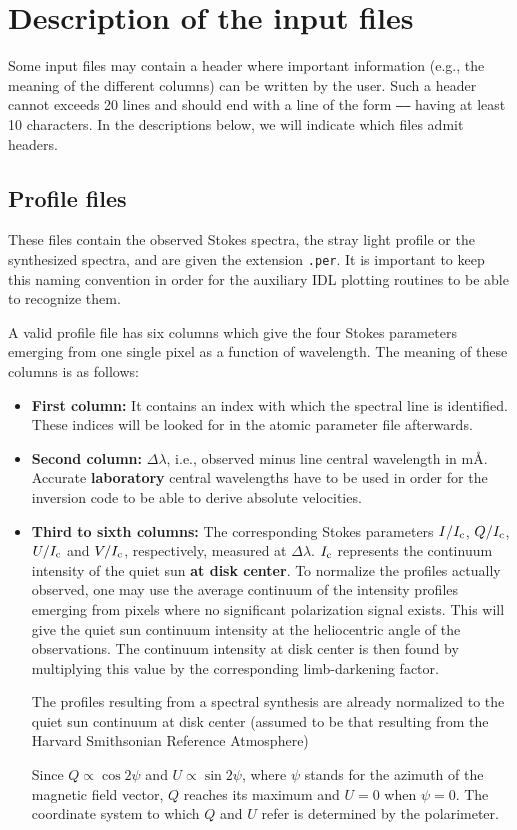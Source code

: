 \section{Description of the input files}
Some input files may contain a header where important information
(e.g., the meaning of the different columns) can be written by the
user. Such a header cannot exceeds 20 lines and should end with a line
of the form {\tt -----} having at least 10 characters. In the
descriptions below, we will indicate which files admit headers.

\subsection{Profile files}
\label{profiles}
These files contain the observed Stokes spectra, the stray light profile or
the synthesized spectra, and are given the extension {\tt .per}. It
is important to keep this naming convention in order for the auxiliary IDL 
plotting routines to be able to recognize them. 

A valid profile file has six columns which give the four Stokes parameters 
emerging from one single pixel as a function of wavelength. The meaning of 
these columns is as follows:
\begin{itemize}
\item {\bf First column:} It contains an index with which the spectral line is 
identified. These indices will be looked for in the atomic parameter file afterwards. 

\item {\bf Second column:} $\Delta \lambda$, i.e., observed minus line central 
wavelength in m\AA\/. Accurate {\bf laboratory} central wavelengths have to be used
in order for the inversion code to be able to derive absolute velocities.

\item {\bf Third to sixth columns:} The corresponding Stokes parameters
$I/I_{\rm c}$, $Q/I_{\rm c}$, $U/I_{\rm c}$ and $V/I_{\rm c}$,
respectively, measured at $\Delta \lambda$.  $I_{\rm c}$ represents the
continuum intensity of the quiet sun  {\bf at disk center}. To
normalize the profiles actually observed, one may use the average
continuum of the intensity profiles emerging from pixels where no
significant polarization signal exists. This will give the quiet
sun continuum intensity at the heliocentric angle of the observations. 
The continuum intensity at disk center is then found by multiplying this
value by the corresponding limb-darkening factor. 

The profiles resulting from a spectral synthesis are already normalized 
to the quiet sun continuum at disk center (assumed to be that resulting from 
the Harvard Smithsonian Reference Atmosphere)

Since $Q \propto \cos 2\psi$ and $U \propto \sin 2\psi$, where $\psi$ 
stands for the azimuth of the magnetic field vector, $Q$ reaches its 
maximum and $U =0$ when $\psi =0$. The coordinate system to which
$Q$ and $U$ refer is determined by the polarimeter. 


\end{itemize}

